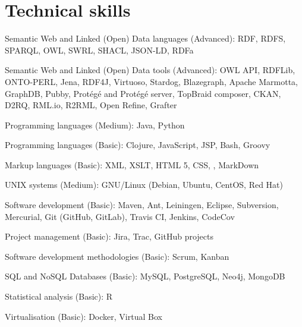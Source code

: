 \documentclass[11pt,fullpage]{article}
\renewenvironment{itemize}{
  \begin{list}{}{
    \setlength{\leftmargin}{1.5em}
  }
}{
  \end{list}
}
\begin{document}
\section*{Technical skills}
\begin{itemize}
	\item Semantic Web and Linked (Open) Data languages (Advanced): RDF, RDFS, SPARQL, OWL, SWRL, SHACL, JSON-LD, RDFa 
	\item Semantic Web and Linked (Open) Data tools (Advanced): OWL API, RDFLib, ONTO-PERL, Jena, RDF4J, Virtuoso, Stardog, Blazegraph, Apache Marmotta, GraphDB, Pubby, Prot\'eg\'e and Prot\'eg\'e server, TopBraid composer, CKAN, D2RQ, RML.io, R2RML, Open Refine, Grafter
	\item Programming languages (Medium): Java, Python
	\item Programming languages (Basic): Clojure, JavaScript, JSP, Bash, Groovy
  	\item Markup languages (Basic): XML, XSLT, HTML 5, CSS, \LaTeXe, MarkDown
	\item UNIX systems (Medium): GNU/Linux (Debian, Ubuntu, CentOS, Red Hat)
	\item Software development (Basic): Maven, Ant, Leiningen, Eclipse, Subversion, Mercurial, Git (GitHub, GitLab), Travis CI, Jenkins, CodeCov
	\item Project management (Basic): Jira, Trac, GitHub projects
	\item Software development methodologies (Basic): Scrum, Kanban
	\item SQL and NoSQL Databases (Basic): MySQL, PostgreSQL, Neo4j, MongoDB
	\item Statistical analysis (Basic): R
	\item Virtualisation (Basic): Docker, Virtual Box
\end{itemize}
\end{document}

